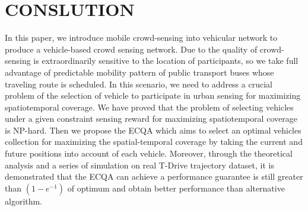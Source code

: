 \documentclass[journal]{IEEEtran}
\begin{document}
\section{CONSLUTION}
In this paper, we introduce mobile crowd-sensing into vehicular network to produce a vehicle-based crowd sensing network. Due to the quality of crowd-sensing is extraordinarily sensitive to the location of participants, so we take full advantage of predictable mobility pattern of public transport buses whose traveling route is scheduled. In this scenario, we need to address a crucial problem of the selection of vehicle to participate in urban sensing for maximizing spatiotemporal coverage. We have proved that the problem of selecting vehicles under a given constraint sensing reward for maximizing spatiotemporal coverage is NP-hard. Then we propose the ECQA which aims to select an optimal vehicles collection for maximizing the spatial-temporal coverage by taking the current and future positions into account of each vehicle. Moreover, through the theoretical analysis and a series of simulation on real T-Drive trajectory dataset, it is demonstrated that the ECQA can achieve a performance guarantee is still greater than $(1-e^{-1})$ of optimum and obtain better performance than alternative algorithm.












%
%
\end{document}
